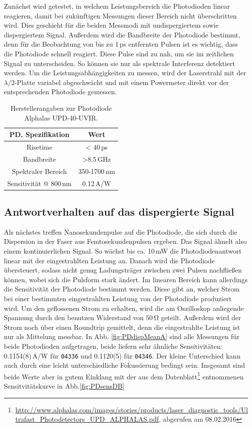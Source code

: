 \documentclass[bachelor,       %
               twoside,        %
               BCOR10mm,       %
               liststotoc,nomtotoc,bibtotoc, %
               english,ngerman, %
               final,          %
               ]{GAUBM}
\begin{document}
Zunächst wird getestet, in welchem Leistungsbereich die Photodioden linear reagieren, damit bei zukünftigen Messungen dieser Bereich nicht überschritten wird.
Dies geschieht für die beiden Messmodi mit undispergiertem sowie dispergiertem Signal.
Außerdem wird die Bandbreite der Photodiode bestimmt, denn für die Beobachtung von bis zu 1\,ps entfernten Pulsen ist es wichtig, dass die Photodiode schnell reagiert.
Diese Pulse sind zu nah, um sie im zeitlichen Signal zu unterscheiden.
So können sie nur als spektrale Interferenz detektiert werden.
Um die Leistungsabhängigkeiten zu messen, wird der Laserstrahl mit der $\lambda/2$-Platte variabel abgeschwächt und mit einem Powermeter direkt vor der entsprechenden Photodiode gemessen.

\begin{table}[!htb]
	\centering
	\begin{tabular}{|c|c|}
		\hline
		PD. Spezifikation & Wert \\		
		\hline
		Risetime & < 40\,ps \\
		Bandbreite & >8.5\,GHz \\
		Spektraler Bereich & 350-1700\,nm \\
		Sensitivität @ 800\,nm & 0.12\,A/W\\
		\hline	
	\end{tabular}
	\caption{Herstellerangaben zur Photodiode Alphalas UPD-40-UVIR.}
	\label{tab:PD}
\end{table}

\subsection{Antwortverhalten auf das dispergierte Signal}
Als nächstes treffen Nanosekundenpulse auf die Photodiode, die sich durch die Dispersion in der Faser aus Femtosekundenpulsen ergeben.
Das Signal ähnelt also einem kontinuierlichen Signal.
So wächst bis ca. 10\,mW die Photodiodenantwort linear mit der eingestrahlten Leistung an.
Danach wird die Photodiode übersteuert, sodass nicht genug Ladungsträger zwischen zwei Pulsen nachfließen können, wobei sich die Pulsform stark ändert.
Im linearen Bereich kann allerdings die Sensitivität der Photodiode bestimmt werden.
Diese gibt an, welcher Strom bei einer bestimmten eingestrahlten Leistung von der Photodiode produziert wird.
Um den geflossenen Strom zu erhalten, wird die am Oszilloskop anliegende Spannung durch den benutzen Widerstand von $50\,\si\ohm$ geteilt.
Außerdem wird der Strom noch über einen Roundtrip gemittelt, denn die eingestrahlte Leistung ist nur als Mittelung messbar.
In Abb. \ref{fig:PDdispMeanA} sind alle Messungen für beide Photodioden aufgetragen, beide liefern sehr ähnliche Sensitivitäten: 0.1154(8)\,A/W für  \texttt{04336} und  0.1120(5) für \texttt{04346}.
Der kleine Unterschied kann auch durch eine leicht unterschiedliche Fokussierung bedingt sein.
Insgesamt sind beide Werte aber in gutem Einklang mit der aus dem Datenblatt\footnote{\url{http://www.alphalas.com/images/stories/products/laser_diagnostic_tools/Ultrafast_Photodetectors_UPD_ALPHALAS.pdf}, abgerufen am 08.02.2016} entnommenen Sensitvitätskurve in Abb.\ref{fig:PDsensDB}
\end{document}
